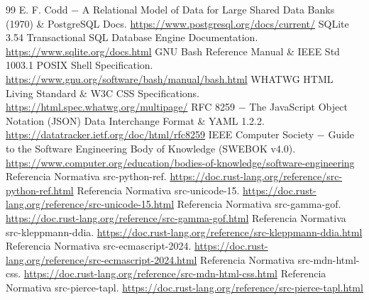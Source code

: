 \documentclass{book}
\begin{document}
\begin{thebibliography}{99}
 E. F. Codd \(-\) A Relational Model of Data for Large Shared Data Banks (1970) \& PostgreSQL Docs. \url{https://www.postgresql.org/docs/current/}
 SQLite 3.54 Transactional SQL Database Engine Documentation. \url{https://www.sqlite.org/docs.html}
 GNU Bash Reference Manual \& IEEE Std 1003.1 POSIX Shell Specification. \url{https://www.gnu.org/software/bash/manual/bash.html}
 WHATWG HTML Living Standard \& W3C CSS Specifications. \url{https://html.spec.whatwg.org/multipage/}
 RFC 8259 \(-\) The JavaScript Object Notation (JSON) Data Interchange Format \& YAML 1.2.2. \url{https://datatracker.ietf.org/doc/html/rfc8259}
 IEEE Computer Society \(-\) Guide to the Software Engineering Body of Knowledge (SWEBOK v4.0). \url{https://www.computer.org/education/bodies-of-knowledge/software-engineering}
 Referencia Normativa src-python-ref. \url{https://doc.rust-lang.org/reference/src-python-ref.html}
 Referencia Normativa src-unicode-15. \url{https://doc.rust-lang.org/reference/src-unicode-15.html}
 Referencia Normativa src-gamma-gof. \url{https://doc.rust-lang.org/reference/src-gamma-gof.html}
 Referencia Normativa src-kleppmann-ddia. \url{https://doc.rust-lang.org/reference/src-kleppmann-ddia.html}
 Referencia Normativa src-ecmascript-2024. \url{https://doc.rust-lang.org/reference/src-ecmascript-2024.html}
 Referencia Normativa src-mdn-html-css. \url{https://doc.rust-lang.org/reference/src-mdn-html-css.html}
 Referencia Normativa src-pierce-tapl. \url{https://doc.rust-lang.org/reference/src-pierce-tapl.html}
\end{thebibliography}
\end{document}

